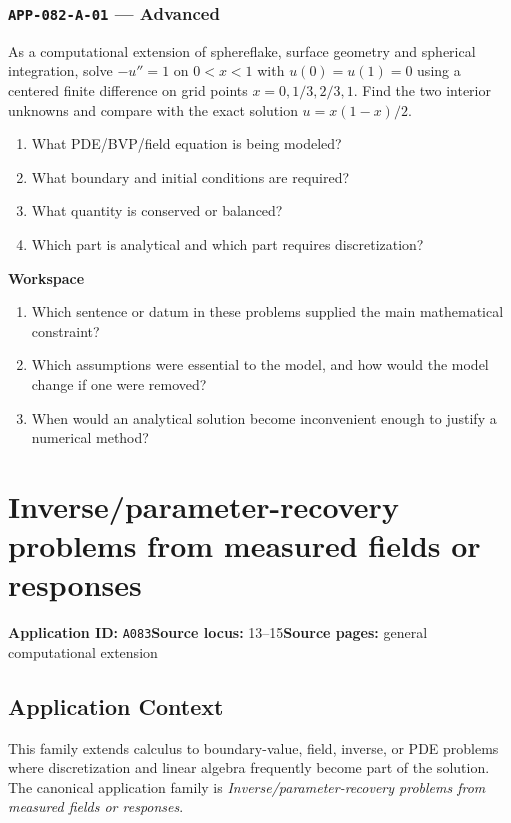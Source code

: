 \documentclass[11pt]{book}
\newcommand{\pid}[1]{\texttt{#1}}
\newcommand{\workspace}{\par\vspace{0.7in}\hrulefill\par\vspace{0.55in}\hrulefill\par}
\begin{document}
\subsection*{\pid{APP-082-A-01} — Advanced}
\begin{problembox}
As a computational extension of sphereflake, surface geometry and spherical integration, solve $-u''=1$ on $0<x<1$ with $u(0)=u(1)=0$ using a centered finite difference on grid points $x=0,1/3,2/3,1$. Find the two interior unknowns and compare with the exact solution $u=x(1-x)/2$.
\end{problembox}
\begin{promptbox}\begin{enumerate}
\item What PDE/BVP/field equation is being modeled?
\item What boundary and initial conditions are required?
\item What quantity is conserved or balanced?
\item Which part is analytical and which part requires discretization?
\end{enumerate}\end{promptbox}
\textbf{Workspace}\workspace
\begin{reflectionbox}\begin{enumerate}
\item Which sentence or datum in these problems supplied the main mathematical constraint?
\item Which assumptions were essential to the model, and how would the model change if one were removed?
\item When would an analytical solution become inconvenient enough to justify a numerical method?
\end{enumerate}\end{reflectionbox}
\chapter{Inverse/parameter-recovery problems from measured fields or responses}\label{app:A083}
\textbf{Application ID:} \pid{A083}\quad \textbf{Source locus:} 13–15\quad \textbf{Source pages:} general computational extension
\section*{Application Context}
This family extends calculus to boundary-value, field, inverse, or PDE problems where discretization and linear algebra frequently become part of the solution. The canonical application family is \emph{Inverse/parameter-recovery problems from measured fields or responses}.
\end{document}
